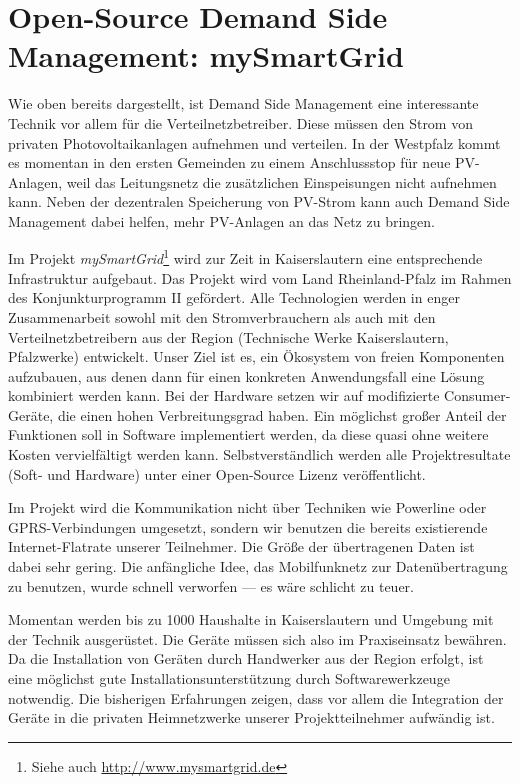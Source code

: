 \documentclass[12pt,BCOR=8.5mm]{scrartcl}
\begin{document}
\section{Open-Source Demand Side Management: mySmartGrid}\label{sec:chancen_open-source}

Wie oben bereits dargestellt, ist Demand Side Management eine
interessante Technik vor allem für die Verteilnetzbetreiber. Diese
müssen den Strom von privaten Photovoltaikanlagen aufnehmen und
verteilen. In der Westpfalz kommt es momentan in den ersten Gemeinden zu
einem Anschlussstop für neue PV-Anlagen, weil das Leitungsnetz die
zusätzlichen Einspeisungen nicht aufnehmen kann. Neben der dezentralen
Speicherung von PV-Strom kann auch Demand Side Management dabei helfen,
mehr PV-Anlagen an das Netz zu bringen.

Im Projekt \emph{mySmartGrid}\footnote{Siehe auch
\url{http://www.mysmartgrid.de}} wird zur Zeit in Kaiserslautern eine
entsprechende Infrastruktur aufgebaut. Das Projekt wird vom Land
Rheinland-Pfalz im Rahmen des Konjunkturprogramm II gefördert. Alle
Technologien werden in enger Zusammenarbeit sowohl mit den
Stromverbrauchern als auch mit den Verteilnetzbetreibern aus der Region
(Technische Werke Kaiserslautern, Pfalzwerke) entwickelt.  Unser Ziel
ist es, ein Ökosystem von freien Komponenten aufzubauen, aus denen dann
für einen konkreten Anwendungsfall eine Lösung kombiniert werden kann.
Bei der Hardware setzen wir auf modifizierte
Consumer-Geräte, die einen hohen Verbreitungsgrad haben.  Ein möglichst
großer Anteil der Funktionen soll in Software implementiert werden, da
diese quasi ohne weitere Kosten vervielfältigt werden kann.
Selbstverständlich werden alle Projektresultate (Soft- und Hardware)
unter einer Open-Source Lizenz veröffentlicht. 

Im Projekt wird die Kommunikation nicht über Techniken wie Powerline
oder GPRS-Verbindungen umgesetzt, sondern wir benutzen die bereits
existierende Internet-Flatrate unserer Teilnehmer. Die Größe der
übertragenen Daten ist dabei sehr gering. Die anfängliche Idee,
das Mobilfunknetz zur Datenübertragung zu benutzen, wurde schnell
verworfen --- es wäre schlicht zu teuer.

Momentan werden bis zu 1000 Haushalte in Kaiserslautern und Umgebung
mit der Technik ausgerüstet. Die Geräte müssen sich also im
Praxiseinsatz bewähren. Da die Installation von Geräten durch
Handwerker aus der Region erfolgt, ist eine möglichst gute
Installationsunterstützung durch Softwarewerkzeuge notwendig. Die
bisherigen Erfahrungen zeigen, dass vor allem die Integration der Geräte
in die privaten Heimnetzwerke unserer Projektteilnehmer aufwändig ist.
\end{document}
